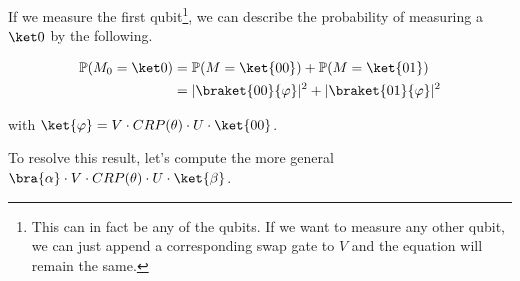 If we measure the first qubit\footnote{
    This can in fact be any of the qubits.
    If we want to measure any other qubit, we can just append a corresponding
    swap gate to $V$ and the equation will remain the same.
}, we can describe the probability of measuring a $\ket 0$ by the following.

\begin{equation}
    \label{eq1}
    \begin{split}
        \mathbb{P}(M_0 = \ket 0)
            &= \mathbb{P}(M = \ket{00}) + \mathbb{P}(M = \ket{01}) \\
            &= \lvert\braket{00}{\varphi}\rvert^2 + \lvert\braket{01}{\varphi}\rvert^2
    \end{split}
\end{equation}

with $\ket{\varphi} = V \cdot CRP(\theta) \cdot U \cdot \ket{00}$.

To resolve this result, let's compute the more general
$\bra{\alpha} \cdot V \cdot CRP(\theta) \cdot U \cdot \ket{\beta}$.

